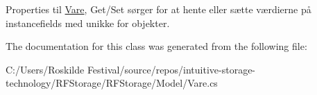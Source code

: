 Properties til \mbox{\hyperlink{class_r_f_storage_1_1_model_1_1_vare}{Vare}}, Get/\+Set sørger for at hente eller sætte værdierne på instancefields med unikke for objekter. 



The documentation for this class was generated from the following file\+:\begin{DoxyCompactItemize}
\item 
C\+:/\+Users/\+Roskilde Festival/source/repos/intuitive-\/storage-\/technology/\+R\+F\+Storage/\+R\+F\+Storage/\+Model/Vare.\+cs\end{DoxyCompactItemize}
